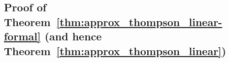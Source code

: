 \documentclass[10pt]{article}
\newtheorem{theorem}{Theorem}
\newcommand{\eps}{\varepsilon}
\DeclareMathOperator*{\argmax}{arg\,max}
\newcommand{\<}{\left\langle}
\renewcommand{\>}{\right\rangle}
\newcommand{\brac}[1]{{\left[ #1 \right]}}
\newcommand{\E}{\mathbb{E}}
\newcommand{\inst}{{\mathsf{M}}}
\newcommand{\TS}{{\mathrm{TS}}}
\newcommand{\tcO}{{\tilde{\mathcal O}}}
\newcommand{\state}{{s}}
\newcommand{\action}{{a}}
\newcommand{\totlen}{{T}} %
\newcommand{\sAlg}{{\mathsf{Alg}}}
\newcommand{\Numobs}{{n}}   %
\newcommand{\Parspace}{{\Theta}}
\newcommand{\esttfpar}{{\widehat{\btheta}}}
\newcommand{\prior}{{\Lambda}}
\newcommand{\shortexp}{{E}}
\newcommand{\tfparspace}{{\Theta}}
\newcommand{\totreward}{{\mathfrak{R}}}  %
\newcommand{\distratio}{{\mathcal{R}}}
\def\sA{{\mathbb{A}}}
\def\btheta{{\boldsymbol \theta}}
\def\ba{{\mathbf a}}
\def\bw{{\mathbf w}}
\newcommand{\authnote}[2]{{\scriptsize $\ll$\textsf{#1 notes: #2}$\gg$}}
\newcommand{\authnote}[2]{}
\newcommand{\lc}[1]{{\color{blue}\authnote{Licong}{#1}}}
\begin{document}

























\subsection{Proof of Theorem~\ref{thm:approx_thompson_linear-formal} (and hence Theorem~\ref{thm:approx_thompson_linear}) }\label{sec:pf_thm:approx_thompson_linear-formal}
\end{document}
